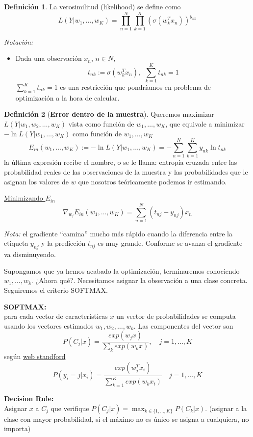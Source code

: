 \documentclass[11pt,a4paper]{article}
\theoremstyle{definition}
\newtheorem{definition}{Definición}[section]
\begin{document}
	\begin{definition}
		La verosimilitud (likelihood) se define como
		$$L(Y| w_1,\ldots, w_K)=\prod_{n=1}^N\prod_{k=1}^K \left(\sigma(w_k^Tx_n)\right)^{y_{nk}}$$
	\end{definition}
	
	\textit{Notación:}
	\begin{itemize}
		\item Dada una observación $x_n$, $n\in N$,
		$$t_{nk}:=\sigma(w_k^T x_n),\ \ \sum_{k=1}^K t_{nk}=1$$
		$\sum_{k=1}^K t_{nk}=1$ es una restricción que pondríamos en problema de optimización a la hora de calcular.
	\end{itemize}
	
	\begin{definition}[\bf Error dentro de la muestra]
		Queremos maximizar $L(Y|w_1,w_2,\ldots ,w_K)$ vista como función de $w_1,\ldots,w_K$, que equivale  a minimizar $-\ln L(Y|w_1,\ldots,w_K)$ como función de $w_1,\ldots ,w_K$
		$$E_{in}(w_1,\ldots,w_K):=-\ln L(Y|w_1,\ldots ,w_K)=-\sum_{n=1}^N \sum_{k=1}^K y_{nk} \ln t_{nk}$$
		la última expresión recibe el nombre, o se le llama: entropía cruzada entre las probabilidad reales de las observaciones de la muestra y las probabilidades que le asignan los valores de $w$ que nosotros teóricamente podemos ir estimando.
	\end{definition}
	
	\underline{Minimizando $E_{in}$}
	$$\nabla_{w_j} E_{in}(w_1,\ldots,w_K)=\sum_{n=1}^N (t_{nj}-y_{nj}) x_n$$
	
	\textit{Nota:} el gradiente ``camina'' mucho más rápido cuando la diferencia entre la etiqueta $y_{nj}$ y la predicción $t_{nj}$ es muy grande. Conforme se avanza el gradiente va disminuyendo.
	
	Supongamos que ya hemos acabado la optimización, terminaremos conociendo $w_1,\ldots ,w_k$. ¿Ahora qué?. Necesitamos asignar la observación a una clase concreta. Seguiremos el criterio SOFTMAX.
	
	\textbf{SOFTMAX:}\\ para cada vector de características $x$ un vector de probabilidades se computa usando los vectores estimados $w_1,w_2,\ldots,w_k$. Las componentes del vector son
	$$P(C_j|x)=\frac{exp(w_jx)}{\sum_k exp(w_kx)}, \quad j=1,\ldots ,K$$
	según \href{http://ufldl.stanford.edu/tutorial/supervised/SoftmaxRegression/}{web standford}
	$$P(y_i=j|x_i)=\frac{exp(w_j^Tx_i)}{\sum_{k=1}^K exp(w_kx_i)} \quad j=1,\ldots ,K$$
	
	\textbf{Decision Rule:}\\ Asignar $x$ a $C_j$ que verifique $P(C_j |x)=\max_{k\in \{1,\ldots, K\}} P(C_k|x)$. (asignar a la clase con mayor probabilidad, si el máximo no es único se asigna a cualquiera, no importa)\\
	
\end{document}

